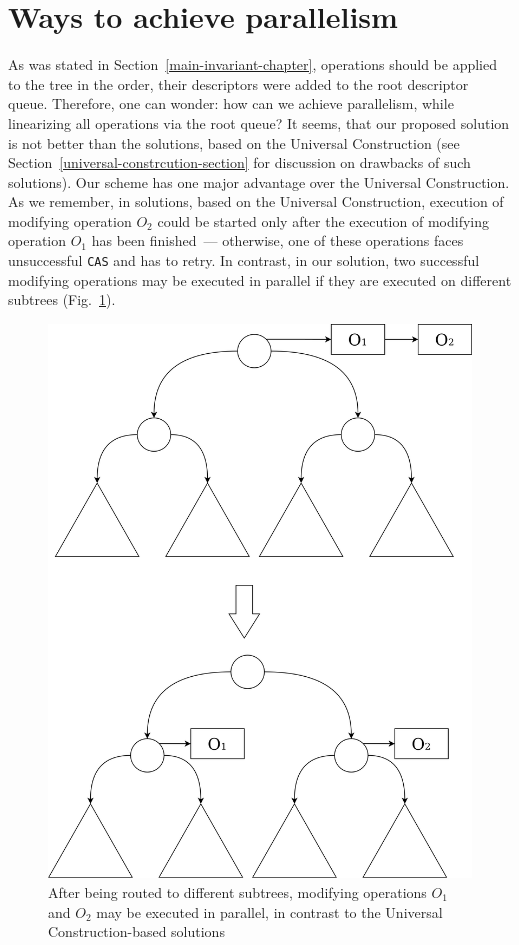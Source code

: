 \documentclass[times, dvipsnames,%
               languages={russian,english} %
              ]{itmo-student-thesis}
\begin{document}
\section{Ways to achieve parallelism}

As was stated in Section~\ref{main-invariant-chapter}, operations should be applied to the tree in
the order, their descriptors were added to the root descriptor queue. Therefore, one can wonder: how can we achieve parallelism, while linearizing all operations via the root queue? It seems, that our proposed solution is not better than the solutions, based on the Universal Construction (see Section~\ref{universal-constrcution-section} for discussion on drawbacks of such solutions). Our scheme has one major advantage over the Universal Construction. As we remember, in solutions, based on the Universal Construction, execution of modifying operation $O_2$ could be started only after the execution of modifying operation $O_1$ has been finished~--- otherwise, one of these operations faces unsuccessful \texttt{CAS} and has to retry. In contrast, in our solution, two successful modifying operations may be executed in parallel if they are executed on different subtrees (Fig.~\ref{paralellism-how-pic}). 

\begin{figure}[H]
  \centering
  \caption{After being routed to different subtrees, modifying operations $O_1$ and $O_2$ may be executed in parallel, in contrast to the Universal Construction-based solutions}
  \label{paralellism-how-pic}
  \includegraphics[width=\linewidth]{pics/paralellism-how.png}
\end{figure}
\end{document}
